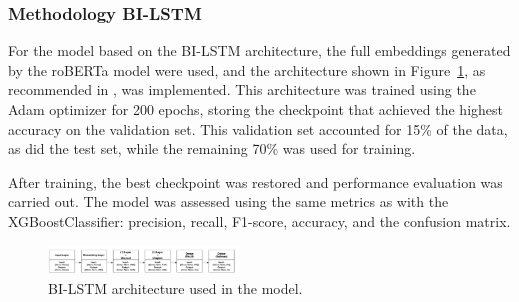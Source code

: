 \subsubsection{Methodology BI-LSTM}

For the model based on the BI-LSTM architecture, the full embeddings generated by the roBERTa model were used, and the architecture shown in Figure~\ref{fig:bilstm_architecture}, as recommended in \cite{fieri2023offensive}, was implemented. This architecture was trained using the Adam optimizer for 200 epochs, storing the checkpoint that achieved the highest accuracy on the validation set. This validation set accounted for 15\% of the data, as did the test set, while the remaining 70\% was used for training. 

After training, the best checkpoint was restored and performance evaluation was carried out. The model was assessed using the same metrics as with the XGBoostClassifier: precision, recall, F1-score, accuracy, and the confusion matrix.

\begin{figure}[htbp]
  \centering
  \includegraphics[width=0.45\textwidth]{images/bilstm_architecture.png}
  \caption{BI-LSTM architecture used in the model.}
  \label{fig:bilstm_architecture}
\end{figure}